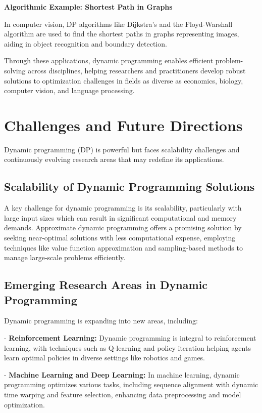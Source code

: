\documentclass[12pt]{book} %
\begin{document}
\textbf{Algorithmic Example: Shortest Path in Graphs}

In computer vision, DP algorithms like Dijkstra's and the Floyd-Warshall algorithm are used to find the shortest paths in graphs representing images, aiding in object recognition and boundary detection.

Through these applications, dynamic programming enables efficient problem-solving across disciplines, helping researchers and practitioners develop robust solutions to optimization challenges in fields as diverse as economics, biology, computer vision, and language processing.


\section{Challenges and Future Directions}

Dynamic programming (DP) is powerful but faces scalability challenges and continuously evolving research areas that may redefine its applications.

\subsection{Scalability of Dynamic Programming Solutions}

A key challenge for dynamic programming is its scalability, particularly with large input sizes which can result in significant computational and memory demands. Approximate dynamic programming offers a promising solution by seeking near-optimal solutions with less computational expense, employing techniques like value function approximation and sampling-based methods to manage large-scale problems efficiently.

\subsection{Emerging Research Areas in Dynamic Programming}

Dynamic programming is expanding into new areas, including:

- \textbf{Reinforcement Learning:} Dynamic programming is integral to reinforcement learning, with techniques such as Q-learning and policy iteration helping agents learn optimal policies in diverse settings like robotics and games.

- \textbf{Machine Learning and Deep Learning:} In machine learning, dynamic programming optimizes various tasks, including sequence alignment with dynamic time warping and feature selection, enhancing data preprocessing and model optimization.
\end{document}

